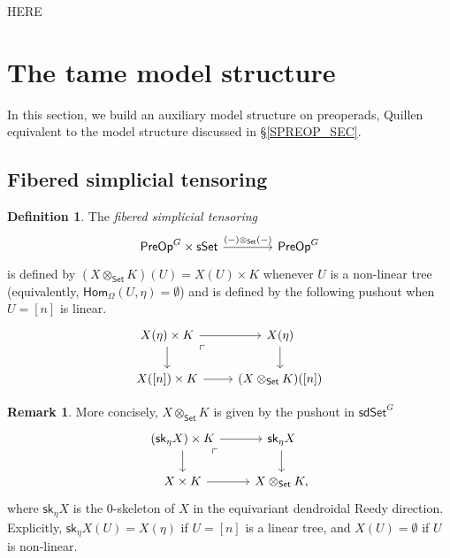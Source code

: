 \documentclass[a4paper,10pt
,draft
]{article}%
\numberwithin{equation}{section}
\numberwithin{figure}{section}
\theoremstyle{definition} %
\newtheorem{definition}[equation]{Definition}%
\newtheorem{remark}[equation]{Remark}%
\newcommand{\1}{\ensuremath{\mathbbm 1}}%
\begin{document}
{\color{red} HERE}




\newpage







\section{The tame model structure}
\label{TAME_SEC}

In this section, we build an auxiliary model structure on preoperads, Quillen equivalent to the model structure discussed in \S \ref{SPREOP_SEC}.





\subsection{Fibered simplicial tensoring}

\begin{definition}
	The \textit{fibered simplicial tensoring} 
\[
	\begin{tikzcd}[row sep = 0, column sep = 40pt]
	\mathsf{PreOp}^G \times \mathsf{sSet} \ar{r}{(-)\otimes_{\mathsf{Set}}(-)} &
	\mathsf{PreOp}^G
	\end{tikzcd}
\]
	is defined by $(X \otimes_{\mathsf{Set}} K)(U) = X(U) \times K$
	whenever $U$ is a non-linear tree (equivalently, 
	$\mathsf{Hom}_{\Omega}(U,\eta)=\emptyset$) and
	is defined by the following pushout when $U=[n]$ is linear.
\[
	\begin{tikzcd}
	X(\eta) \times K \ar{r} \ar{d} \arrow[dr, phantom, "\ulcorner", very near start]  &
	X(\eta) \ar{d}
	\\
	X([n]) \times K \ar{r} & 
	(X \otimes_{\mathsf{Set}} K)([n]) 
	\end{tikzcd}
\]
\end{definition}



\begin{remark}
	More concisely, $X \otimes_{\mathsf{Set}} K$ is given by the pushout in $\mathsf{sdSet}^G$
	\[
	\begin{tikzcd}
	\left(\mathsf{sk}_{\eta}X \right) \times K \ar{r} \ar{d} \arrow[dr, phantom, "\ulcorner", very near start]  &
	\mathsf{sk}_{\eta}X \ar{d}
	\\
	X \times K \ar{r} & 
	X \otimes_{\mathsf{Set}} K,
	\end{tikzcd}
	\]
	where $\mathsf{sk}_{\eta}X$ is the 0-skeleton of $X$ in the equivariant dendroidal Reedy direction.
	Explicitly, $\mathsf{sk}_{\eta}X(U) = X(\eta)$ if $U = [n]$ is a linear tree, 
	and $X(U) = \emptyset$ if $U$ is non-linear.
\end{remark}
\end{document}
